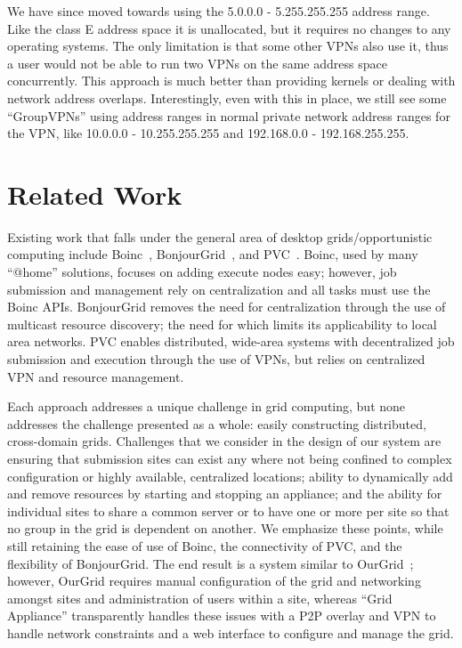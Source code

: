 \documentclass[conference]{IEEEtran}
\begin{document}
We have since moved towards using the 5.0.0.0 - 5.255.255.255 address range.
Like the class E address space it is unallocated, but it requires no changes to
any operating systems.  The only limitation is that some other VPNs also use
it, thus a user would not be able to run two VPNs on the same address space
concurrently.  This approach is much better than providing kernels or dealing
with network address overlaps.  Interestingly, even with this in place, we
still see some ``GroupVPNs''  using address ranges in normal private network
address ranges for the VPN, like 10.0.0.0 - 10.255.255.255 and 192.168.0.0 -
192.168.255.255.

\section{Related Work}
\label{related_work}

Existing work that falls under the general area of desktop grids/opportunistic
computing include Boinc~\cite{boinc}, BonjourGrid~\cite{bonjourgrid}, and
PVC~\cite{pvc}.  Boinc, used by many ``@home'' solutions, focuses on adding
execute nodes easy; however, job submission and management rely on
centralization and all tasks must use the Boinc APIs.  BonjourGrid removes the
need for centralization through the use of multicast resource discovery; the
need for which limits its applicability to local area networks.  PVC enables
distributed, wide-area systems with decentralized job submission and execution
through the use of VPNs, but relies on centralized VPN and resource management.

Each approach addresses a unique challenge in grid computing, but none
addresses the challenge presented as a whole: easily constructing distributed,
cross-domain grids.  Challenges that we consider in the design of our system
are ensuring that submission sites can exist any where not being confined to
complex configuration or highly available, centralized locations; ability to
dynamically add and remove resources by starting and stopping an appliance; and
the ability for individual sites to share a common server or to have one or
more per site so that no group in the grid is dependent on another.  We
emphasize these points, while still retaining the ease of use of Boinc, the
connectivity of PVC, and the flexibility of BonjourGrid.  The end result is a
system similar to OurGrid~\cite{ourgrid}; however, OurGrid requires manual
configuration of the grid and networking amongst sites and  administration of
users within a site, whereas ``Grid Appliance'' transparently handles these
issues with a P2P overlay and VPN to handle network constraints and a web
interface to configure and manage the grid.
\end{document}
